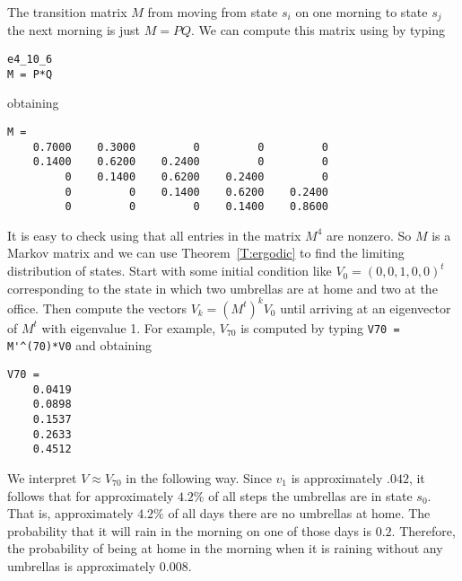 \documentclass{ximera}
\begin{document}
The transition matrix $M$ from
moving from state $s_i$ on one morning to
state $s_j$ the next morning is just $M=PQ$.  We can compute this matrix
using \Matlab by typing
\begin{verbatim}
e4_10_6
M = P*Q
\end{verbatim}
obtaining
\begin{verbatim}
M =
    0.7000    0.3000         0         0         0
    0.1400    0.6200    0.2400         0         0
         0    0.1400    0.6200    0.2400         0
         0         0    0.1400    0.6200    0.2400
         0         0         0    0.1400    0.8600
\end{verbatim}
It is easy to check using \Matlab that all entries in the matrix $M^4$ are
nonzero.  So $M$ is a Markov matrix and we can use
Theorem~\ref{T:ergodic}
to find the limiting distribution of states.  Start with some initial
condition like $V_0=(0,0,1,0,0)^t$ corresponding to the state in which two
umbrellas are at home and two at the office.  Then compute the vectors
$V_k=(M^t)^kV_0$ until arriving at an eigenvector of $M^t$ with eigenvalue 1.
For example, $V_{70}$ is computed by typing \verb+V70 = M'^(70)*V0+ and
obtaining
\begin{verbatim}
V70 =
    0.0419
    0.0898
    0.1537
    0.2633
    0.4512
\end{verbatim}
We interpret $V\approx V_{70}$ in the following way.  Since $v_1$ is
approximately $.042$, it follows that for approximately $4.2\%$ of all steps 
the umbrellas are in state $s_0$.  That is, approximately $4.2\%$ of all days 
there are no umbrellas at home.  The probability that it will rain in the 
morning on one of those days is $0.2$.  Therefore, the probability of being 
at home in the morning when it is raining without any umbrellas is 
approximately $0.008$.







\end{document}
